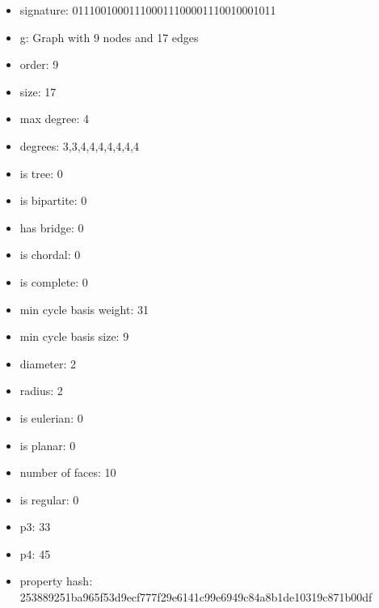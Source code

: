 \newpage
\begin{figure}
\end{figure}
\begin{itemize}
\item signature: 011100100011100011100001110010001011
\item g: Graph with 9 nodes and 17 edges
\item order: 9
\item size: 17
\item max degree: 4
\item degrees: 3,3,4,4,4,4,4,4,4
\item is tree: 0
\item is bipartite: 0
\item has bridge: 0
\item is chordal: 0
\item is complete: 0
\item min cycle basis weight: 31
\item min cycle basis size: 9
\item diameter: 2
\item radius: 2
\item is eulerian: 0
\item is planar: 0
\item number of faces: 10
\item is regular: 0
\item p3: 33
\item p4: 45
\item property hash: 253889251ba965f53d9ecf777f29e6141c99e6949c84a8b1de10319c871b00df
\end{itemize}
